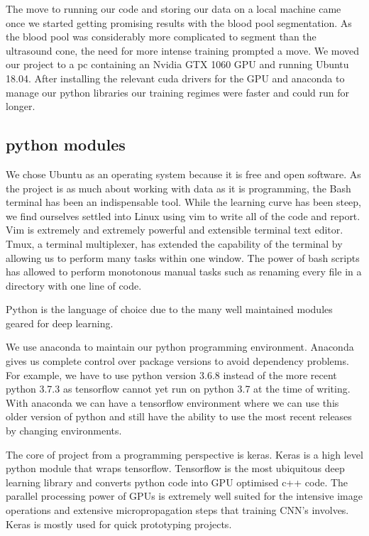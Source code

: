 \documentclass[12pt]{article}
\begin{document}
The move to running our code and storing our data on a local machine came once we started getting promising results with the blood pool segmentation.
As the blood pool was considerably more complicated to segment than the ultrasound cone, the need for more intense training prompted a move.
We moved our project to a pc containing an Nvidia GTX 1060 GPU and running Ubuntu 18.04.
After installing the relevant cuda drivers for the GPU and anaconda to manage our python libraries our training regimes were faster and could run for longer.


\subsection{python modules}

We chose Ubuntu as an operating system because it is free and open software.
As the project is as much about working with data as it is programming, the Bash terminal has been an indispensable tool.
While the learning curve has been steep, we find ourselves settled into Linux using vim to write all of the code and report.
Vim is extremely and extremely powerful and extensible terminal text editor.
Tmux, a terminal multiplexer, has extended the capability of the terminal by allowing us to perform many tasks within one window.
The power of bash scripts has allowed to perform monotonous manual tasks such as renaming every file in a directory with one line of code.
\par
Python is the language of choice due to the many well maintained modules geared for deep learning.
\par
We use anaconda to maintain our python programming environment.
Anaconda gives us complete control over package versions to avoid dependency problems.
For example, we have to use python version 3.6.8 instead of the more recent python 3.7.3 as tensorflow cannot yet run on python 3.7 at the time of writing.
With anaconda we can have a tensorflow environment where we can use this older version of python and still have the ability to use the most recent releases by changing environments.
\par
The core of project from a programming perspective is keras.
Keras is a high level python module that wraps tensorflow.
Tensorflow is the most ubiquitous deep learning library and converts python code into GPU optimised c++ code.
The parallel processing power of GPUs is extremely well suited for the intensive image operations and extensive micropropagation steps that training CNN's involves.
Keras is mostly used for quick prototyping projects.
\end{document}
